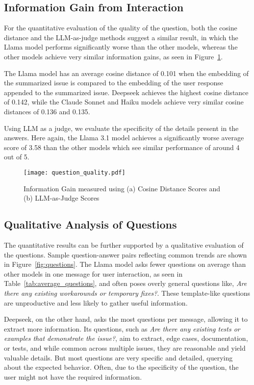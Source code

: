 \subsection{Information Gain from Interaction}
For the quantitative evaluation of the quality of the question, both the cosine distance and the LLM-as-judge methods suggest a similar result, in which the Llama model performs significantly worse than the other models, whereas the other models achieve very similar information gains, as seen in Figure~\ref{fig:question_quality}.

The Llama model has an average cosine distance of 0.101 when the embedding of the summarized issue is compared to the embedding of the user response appended to the summarized issue. Deepseek achieves the highest cosine distance of 0.142, while the Claude Sonnet and Haiku models achieve very similar cosine distances of 0.136 and 0.135.

Using LLM as a judge, we evaluate the specificity of the details present in the answers. Here again, the Llama 3.1 model achieves a significantly worse average score of 3.58 than the other models which see similar performance of around 4 out of 5.



\begin{figure}[h!]
	\centering
	\texttt{[image: question\_quality.pdf]}
	\caption{Information Gain measured using (a) Cosine Distance Scores and (b) LLM-as-Judge Scores 
    }
	\vspace{-12pt}\label{fig:question_quality}
\end{figure}


\subsection{Qualitative Analysis of Questions}

The quantitative results can be further supported by a qualitative evaluation of the questions. Sample question-answer pairs reflecting common trends are shown in Figure~\ref{fig:questions}. The Llama model asks fewer questions on average than other models in one message for user interaction, as seen in Table~\ref{tab:average_questions}, and often poses overly general questions like, \textit{Are there any existing workarounds or temporary fixes?}. These template-like questions are unproductive and less likely to gather useful information. 

Deepseek, on the other hand, asks the most questions per message, allowing it to extract more information. Its questions, such as \textit{Are there any existing tests or examples that demonstrate the issue?}, aim to extract, edge cases, documentation, or tests, and while common across multiple issues, they are reasonable and yield valuable details. But most questions are very specific and detailed, querying about the expected behavior. Often, due to the specificity of the question, the user might not have the required information.



